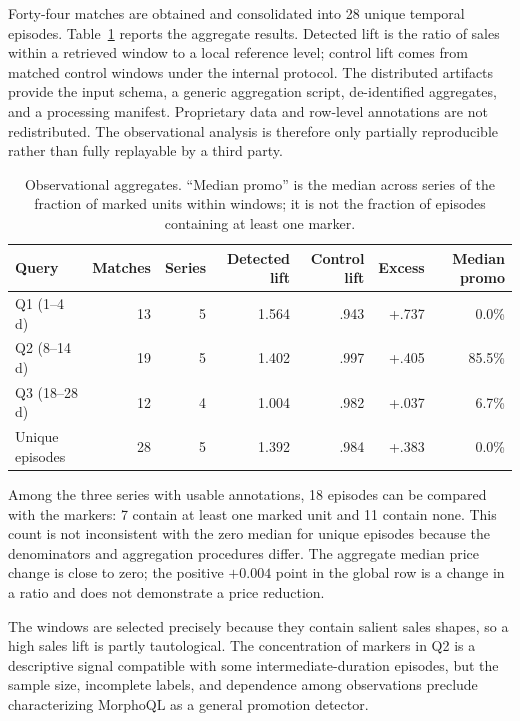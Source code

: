 \documentclass[11pt,a4paper]{article}
\begin{document}
Forty-four matches are obtained and consolidated into 28 unique temporal episodes. Table~\ref{tab:real-results} reports the aggregate results. Detected lift is the ratio of sales within a retrieved window to a local reference level; control lift comes from matched control windows under the internal protocol. The distributed artifacts provide the input schema, a generic aggregation script, de-identified aggregates, and a processing manifest. Proprietary data and row-level annotations are not redistributed. The observational analysis is therefore only partially reproducible rather than fully replayable by a third party.

\begin{table}[H]
\centering
\caption{Observational aggregates. ``Median promo'' is the median across series of the fraction of marked units within windows; it is not the fraction of episodes containing at least one marker.}
\label{tab:real-results}
\small
\begin{tabular}{lrrrrrr}
\toprule
Query & Matches & Series & Detected lift & Control lift & Excess & Median promo \\
\midrule
Q1 (1--4 d) & 13 & 5 & 1.564 & .943 & +.737 & 0.0\% \\
Q2 (8--14 d) & 19 & 5 & 1.402 & .997 & +.405 & 85.5\% \\
Q3 (18--28 d) & 12 & 4 & 1.004 & .982 & +.037 & 6.7\% \\
Unique episodes & 28 & 5 & 1.392 & .984 & +.383 & 0.0\% \\
\bottomrule
\end{tabular}
\end{table}

Among the three series with usable annotations, 18 episodes can be compared with the markers: 7 contain at least one marked unit and 11 contain none. This count is not inconsistent with the zero median for unique episodes because the denominators and aggregation procedures differ. The aggregate median price change is close to zero; the positive $+0.004$ point in the global row is a change in a ratio and does not demonstrate a price reduction.

The windows are selected precisely because they contain salient sales shapes, so a high sales lift is partly tautological. The concentration of markers in Q2 is a descriptive signal compatible with some intermediate-duration episodes, but the sample size, incomplete labels, and dependence among observations preclude characterizing MorphoQL as a general promotion detector.
\end{document}
